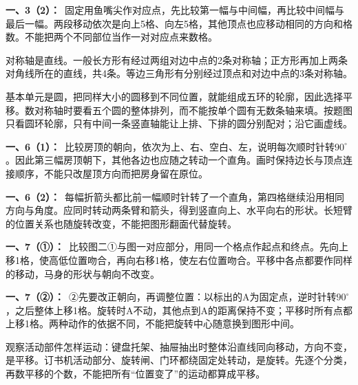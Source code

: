 \documentclass[multi=snippet,border=0pt]{standalone}
\newenvironment{snippet}[3]{\begin{minipage}{#1bp}\color{answerred}\fontsize{#2}{#3}\selectfont\raggedright}{\end{minipage}}
\begin{document}
\begin{snippet}{505}{11.5}{14}\textbf{一、3（2）：}\ 固定用鱼嘴尖作对应点，先比较第一幅与中间幅，再比较中间幅与最后一幅。两段移动依次是向上5格、向左5格，其他顶点也应移动相同的方向和格数。不能把两个不同部位当作一对对应点来数格。\end{snippet}
\begin{snippet}{505}{11.5}{14}对称轴是直线。一般长方形有经过两组对边中点的2条对称轴；正方形再加上两条对角线所在的直线，共4条。等边三角形有分别经过顶点和对边中点的3条对称轴。\end{snippet}
\begin{snippet}{505}{11.5}{14}基本单元是圆，把同样大小的圆移到不同位置，就能组成五环的轮廓，因此选择平移。数对称轴时要看五个圆的整体排列，而不能按单个圆有无数条轴来填。按题图只看圆环轮廓，只有中间一条竖直轴能让上排、下排的圆分别配对；沿它画虚线。\end{snippet}
\begin{snippet}{505}{11.5}{14}\textbf{一、6（1）：}\ 比较房顶的朝向，依次为上、右、空白、左，说明每次顺时针转\(90^\circ\)。因此第三幅房顶朝下，其他各边也应随之转动一个直角。画时保持边长与顶点连接顺序，不能只改屋顶方向而把房身留在原位。\end{snippet}
\begin{snippet}{505}{11.5}{14}\textbf{一、6（2）：}\ 每幅折箭头都比前一幅顺时针转了一个直角，第四格继续沿用相同方向与角度。应同时转动两条臂和箭头，得到竖直向上、水平向右的形状。长短臂的位置关系也随旋转改变，不能把图形翻面代替旋转。\end{snippet}
\begin{snippet}{505}{11.5}{14}\textbf{一、7（①）：}\ 比较图二①与图一对应部分，用同一个格点作起点和终点。先向上移1格，使高低位置吻合，再向右移1格，使左右位置吻合。平移中各点都要作同样的移动，马身的形状与朝向不改变。\end{snippet}
\begin{snippet}{505}{11.5}{14}\textbf{一、7（②）：}\ ②先要改正朝向，再调整位置：以标出的A为固定点，逆时针转\(90^\circ\)，之后整体上移1格。旋转时A不动，其他点到A的距离保持不变；平移时所有点都上移1格。两种动作的依据不同，不能把旋转中心随意换到图形中间。\end{snippet}
\begin{snippet}{505}{11.5}{14}观察活动部件怎样运动：键盘托架、抽屉抽出时整体沿直线同向移动，方向不变，是平移。订书机活动部分、旋转闸、门环都绕固定处转动，是旋转。先逐个分类，再数平移的个数，不能把所有“位置变了”的运动都算成平移。\end{snippet}
\end{document}
